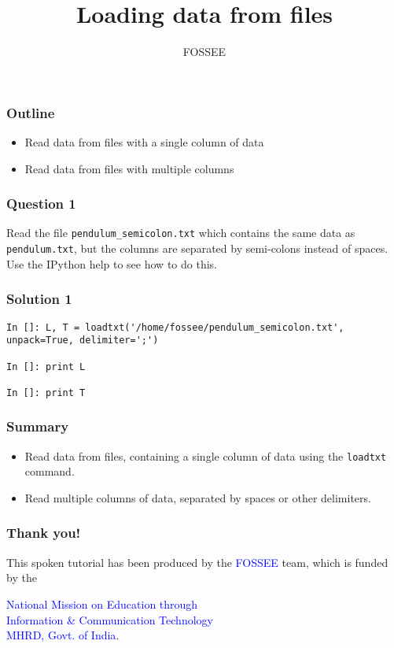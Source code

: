 \documentclass[presentation]{beamer}
\title{Loading data from files}
\author{FOSSEE}
\date{}
\begin{document}
\maketitle









\begin{frame}
\frametitle{Outline}
\label{sec-1}

\begin{itemize}
\item Read data from files with a single column of data
\item Read data from files with multiple columns
\end{itemize}
\end{frame}
\begin{frame}
\frametitle{Question 1}
\label{sec-2}

  Read the file \texttt{pendulum\_semicolon.txt} which contains the same data
  as \texttt{pendulum.txt}, but the columns are separated by semi-colons
  instead of spaces. Use the IPython help to see how to do this.
\end{frame}
\begin{frame}[fragile]
\frametitle{Solution 1}
\label{sec-3}

\lstset{language=Python}
\begin{lstlisting}
In []: L, T = loadtxt('/home/fossee/pendulum_semicolon.txt', unpack=True, delimiter=';')

In []: print L

In []: print T
\end{lstlisting}
\end{frame}
\begin{frame}
\frametitle{Summary}
\label{sec-4}

\begin{itemize}
\item Read data from files, containing a single column of data using the
    \texttt{loadtxt} command.
\item Read multiple columns of data, separated by spaces or other
    delimiters.
\end{itemize}
\end{frame}
\begin{frame}
\frametitle{Thank you!}
\label{sec-5}

  \begin{block}{}
  \begin{center}
  This spoken tutorial has been produced by the
  \textcolor{blue}{FOSSEE} team, which is funded by the 
  \end{center}
  \begin{center}
    \textcolor{blue}{National Mission on Education through \\
      Information \& Communication Technology \\ 
      MHRD, Govt. of India}.
  \end{center}  
  \end{block}
\end{frame}
\end{document}

